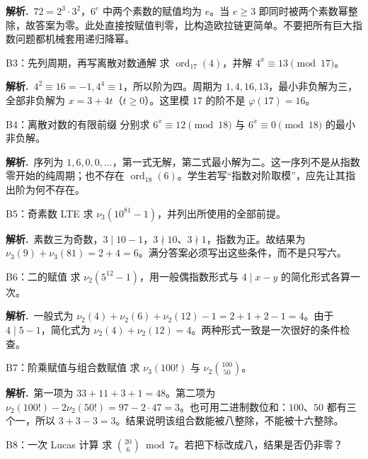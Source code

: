 \documentclass[UTF8,a4paper,11pt,oneside,openany,fontset=fandol]{ctexbook}
\theoremstyle{definition}
\newcommand{\ord}{\operatorname{ord}}
\newcommand{\sol}{\par\noindent\textbf{解析.}\ }
\begin{document}
\sol $72=2^3\cdot3^2$，$6^e$ 中两个素数的赋值均为 $e$。当 $e\ge3$ 即同时被两个素数幂整除，故答案为零。此处直接按赋值判零，比构造欧拉链更简单。不要把所有巨大指数问题都机械套用递归降幂。


\begin{problem}{B3：先列周期，再写离散对数通解}
求 $\ord_{17}(4)$，并解 $4^x\equiv13\pmod{17}$。
\end{problem}

\sol $4^2\equiv16=-1,4^4\equiv1$，所以阶为四。周期为 $1,4,16,13$，最小非负解为三，全部非负解为 $x=3+4t$（$t\ge0$）。这里模 $17$ 的阶不是 $\varphi(17)=16$。


\begin{problem}{B4：离散对数的有限前缀}
分别求 $6^x\equiv12\pmod{18}$ 与 $6^x\equiv0\pmod{18}$ 的最小非负解。
\end{problem}

\sol 序列为 $1,6,0,0,\ldots$，第一式无解，第二式最小解为二。这一序列不是从指数零开始的纯周期；也不存在 $\ord_{18}(6)$。学生若写“指数对阶取模”，应先让其指出阶为何不存在。


\begin{problem}{B5：奇素数 LTE}
求 $\nu_3(10^{81}-1)$，并列出所使用的全部前提。
\end{problem}

\sol 素数三为奇数，$3\mid10-1$，$3\nmid10$、$3\nmid1$，指数为正。故结果为 $\nu_3(9)+\nu_3(81)=2+4=6$。满分答案必须写出这些条件，而不是只写六。


\begin{problem}{B6：二的赋值}
求 $\nu_2(5^{12}-1)$，用一般偶指数形式与 $4\mid x-y$ 的简化形式各算一次。
\end{problem}

\sol 一般式为 $\nu_2(4)+\nu_2(6)+\nu_2(12)-1=2+1+2-1=4$。由于 $4\mid5-1$，简化式为 $\nu_2(4)+\nu_2(12)=4$。两种形式一致是一次很好的条件检查。


\begin{problem}{B7：阶乘赋值与组合数赋值}
求 $\nu_3(100!)$ 与 $\nu_2\binom{100}{50}$。
\end{problem}

\sol 第一项为 $33+11+3+1=48$。第二项为 $\nu_2(100!)-2\nu_2(50!)=97-2\cdot47=3$。也可用二进制数位和：$100$、$50$ 都有三个一，所以 $3+3-3=3$。结果说明该组合数能被八整除，不能被十六整除。


\begin{problem}{B8：一次 Lucas 计算}
求 $\binom{20}{6}\bmod7$。若把下标改成八，结果是否仍非零？
\end{problem}
\end{document}
